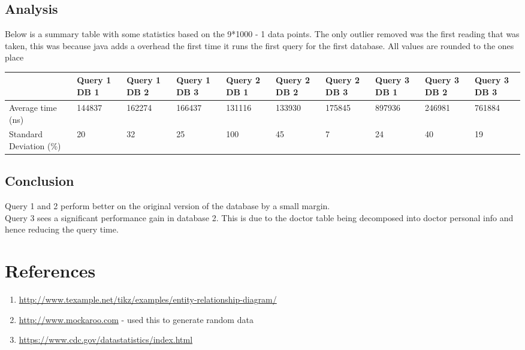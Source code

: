 \documentclass[12pt,arial]{article}
\begin{document}
\subsection{Analysis}
Below is a summary table with some statistics based on the 9*1000 - 1 data points. The only outlier removed was the first reading that was taken, this was because java adds a overhead the first time it runs the first query for the first database. All values are rounded to the ones place\\
\begin{tabularx}{\textwidth}{|X|X|X|X|X|X|X|X|X|X|}
\hline
\  & Query 1 DB 1 & Query 1 DB 2 & Query 1 DB 3 & Query 2 DB 1 &  Query 2 DB 2 & Query 2 DB 3 & Query 3 DB 1 & Query 3 DB 2 & Query 3 DB 3 \\
\hline
Average time (ns) & 144837&162274&166437&131116&133930&175845&897936&246981&761884\\ \hline
Standard Deviation (\%) & 20&32&25&100&45&7&24&40&19\\
\hline
\end{tabularx}


\subsection{Conclusion}
Query 1 and 2 perform better on the original version of the database by a small margin. \\
Query 3 sees a significant performance gain in database 2. This is due to the doctor table being decomposed into doctor personal info and hence reducing the query time.

\section{References} 
\begin{enumerate}
	\item \url{http://www.texample.net/tikz/examples/entity-relationship-diagram/}
	\item \url{http://www.mockaroo.com} - used this to generate random data
	\item \url{https://www.cdc.gov/datastatistics/index.html}
\end{enumerate}
\end{document}
